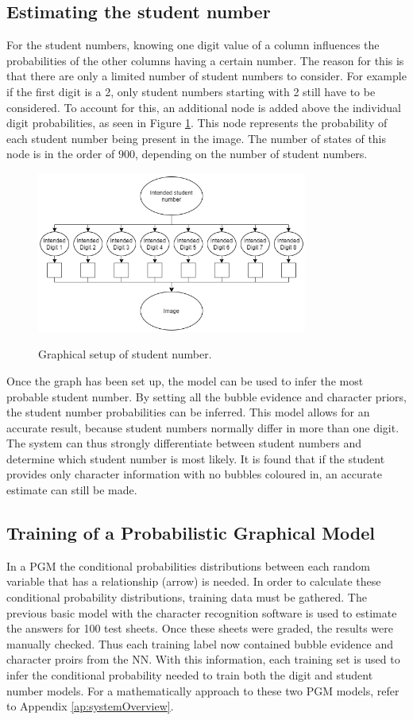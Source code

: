 \subsection{Estimating the student number}
\label{sec:studentNumber}

For the student numbers, knowing one digit value of a column influences the probabilities of the other columns having a certain number. The reason for this is that there are only a limited number of student numbers to consider. For example if the first digit is a 2, only student numbers starting with 2 still have to be considered. To account for this, an additional node is added above the individual digit probabilities, as seen in Figure \ref{fig:stdNumCh4}. This node represents the probability of each student number being present in the image. The number of states of this node is in the order of $ 900$, depending on the number of student numbers.
\begin{figure}[b]
  \centering
  \includegraphics[width=8.9cm]{stdNum}\\
  \caption{Graphical setup of student number.}
  \label{fig:stdNumCh4}
\end{figure}
Once the graph has been set up, the model can be used to infer the most probable student number. By setting all the bubble evidence and character priors, the student number probabilities can be inferred. This model allows for an accurate result, because student numbers normally differ in more than one digit. The system can thus strongly differentiate between student numbers and determine which student number is most likely. It is found that if the student provides only character information with no bubbles coloured in, an accurate estimate can still be made.

\subsection{Training of a Probabilistic Graphical Model}
In a PGM the conditional probabilities distributions between each random variable that has a relationship (arrow) is needed. In order to calculate these conditional probability distributions, training data must be gathered. The previous basic model with the character recognition software is used to estimate the answers for 100 test sheets. Once these sheets were graded, the results were manually checked. Thus each training label now contained bubble evidence and character proirs from the NN. With this information, each training set is used to infer the conditional probability needed to train both the digit and student number models. For a mathematically approach to these two PGM models, refer to Appendix \ref{ap:systemOverview}.

